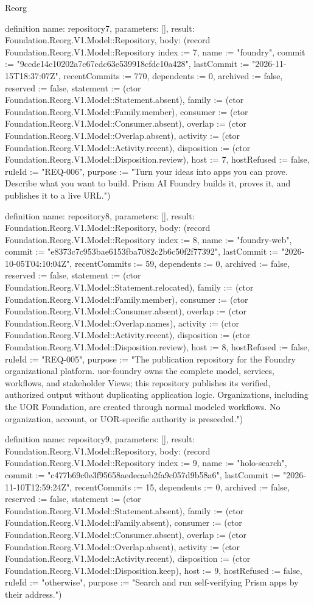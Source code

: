 \begin{lexlean}{Reorg}
\begin{semanticmodule}
definition{
  name: repository7,
  parameters: [],
  result: Foundation.Reorg.V1.Model::Repository,
  body: (record Foundation.Reorg.V1.Model::Repository {index := 7, name := "foundry", commit := "9ccde14c10202a7c67cdc63e539918cfdc10a428", lastCommit := "2026-11-15T18:37:07Z", recentCommits := 770, dependents := 0, archived := false, reserved := false, statement := (ctor Foundation.Reorg.V1.Model::Statement.absent), family := (ctor Foundation.Reorg.V1.Model::Family.member), consumer := (ctor Foundation.Reorg.V1.Model::Consumer.absent), overlap := (ctor Foundation.Reorg.V1.Model::Overlap.absent), activity := (ctor Foundation.Reorg.V1.Model::Activity.recent), disposition := (ctor Foundation.Reorg.V1.Model::Disposition.review), host := 7, hostRefused := false, ruleId := "REQ-006", purpose := "Turn your ideas into apps you can prove. Describe what you want to build. Prism AI Foundry builds it, proves it, and publishes it to a live URL."})
}

definition{
  name: repository8,
  parameters: [],
  result: Foundation.Reorg.V1.Model::Repository,
  body: (record Foundation.Reorg.V1.Model::Repository {index := 8, name := "foundry-web", commit := "e8373c7c953bae6153fba7082c2b6c50f2f77392", lastCommit := "2026-10-05T04:10:04Z", recentCommits := 59, dependents := 0, archived := false, reserved := false, statement := (ctor Foundation.Reorg.V1.Model::Statement.relocated), family := (ctor Foundation.Reorg.V1.Model::Family.member), consumer := (ctor Foundation.Reorg.V1.Model::Consumer.absent), overlap := (ctor Foundation.Reorg.V1.Model::Overlap.names), activity := (ctor Foundation.Reorg.V1.Model::Activity.recent), disposition := (ctor Foundation.Reorg.V1.Model::Disposition.review), host := 8, hostRefused := false, ruleId := "REQ-005", purpose := "The publication repository for the Foundry organizational platform. uor-foundry owns the complete model, services, workflows, and stakeholder Views; this repository publishes its verified, authorized output without duplicating application logic. Organizations, including the UOR Foundation, are created through normal modeled workflows. No organization, account, or UOR-specific authority is preseeded."})
}

definition{
  name: repository9,
  parameters: [],
  result: Foundation.Reorg.V1.Model::Repository,
  body: (record Foundation.Reorg.V1.Model::Repository {index := 9, name := "holo-search", commit := "c477b69c0e3f95658aedecaeb2fa9c057d9b58a6", lastCommit := "2026-11-10T12:59:24Z", recentCommits := 15, dependents := 0, archived := false, reserved := false, statement := (ctor Foundation.Reorg.V1.Model::Statement.absent), family := (ctor Foundation.Reorg.V1.Model::Family.absent), consumer := (ctor Foundation.Reorg.V1.Model::Consumer.absent), overlap := (ctor Foundation.Reorg.V1.Model::Overlap.absent), activity := (ctor Foundation.Reorg.V1.Model::Activity.recent), disposition := (ctor Foundation.Reorg.V1.Model::Disposition.keep), host := 9, hostRefused := false, ruleId := "otherwise", purpose := "Search and run self-verifying Prism apps by their address."})
}


\end{semanticmodule}
\end{lexlean}
